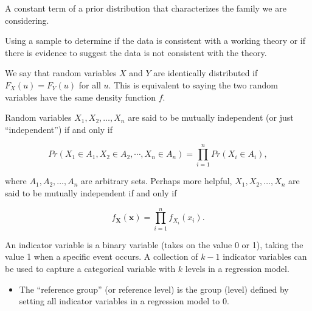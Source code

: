 \documentclass[
  letterpaper,
  DIV=11,
  numbers=noendperiod]{scrreprt}
\providecommand{\tightlist}{%
  \setlength{\itemsep}{0pt}\setlength{\parskip}{0pt}}\usepackage{longtable,booktabs,array}
\theoremstyle{definition}
\theoremstyle{plain}
\theoremstyle{definition}
\theoremstyle{remark}
\begin{document}
\begin{description}
\tightlist
\item[Hyperparameter (Definition~\ref{def-hyperparameter})]
A constant term of a prior distribution that characterizes the family we
are considering.
\item[Hypothesis Testing (Definition~\ref{def-hypothesis-testing})]
Using a sample to determine if the data is consistent with a working
theory or if there is evidence to suggest the data is not consistent
with the theory.
\item[Identically Distributed
(Definition~\ref{def-identically-distributed})]
We say that random variables \(X\) and \(Y\) are identically distributed
if \(F_X(u) = F_Y(u)\) for all \(u\). This is equivalent to saying the
two random variables have the same density function \(f\).
\item[Independence (Definition~\ref{def-independence})]
Random variables \(X_1, X_2, \dotsc, X_n\) are said to be mutually
independent (or just ``independent'') if and only if
\end{description}

\[Pr\left(X_1 \in A_1, X_2 \in A_2, \dotsb, X_n \in A_n\right) = \prod_{i=1}^{n} Pr\left(X_i \in A_i\right),\]

where \(A_1, A_2, \dotsc, A_n\) are arbitrary sets. Perhaps more
helpful, \(X_1, X_2, \dotsc, X_n\) are said to be mutually independent
if and only if

\[f_{\mathbf{X}}(\mathbf{x}) = \prod_{i=1}^{n} f_{X_i}\left(x_i\right).\]

\begin{description}
\tightlist
\item[Indicator Variable (Definition~\ref{def-indicator-variable})]
An indicator variable is a binary variable (takes on the value 0 or 1),
taking the value 1 when a specific event occurs. A collection of \(k-1\)
indicator variables can be used to capture a categorical variable with
\(k\) levels in a regression model.
\end{description}

\begin{itemize}
\tightlist
\item
  The ``reference group'' (or reference level) is the group (level)
  defined by setting all indicator variables in a regression model to 0.
\end{itemize}
\end{document}
